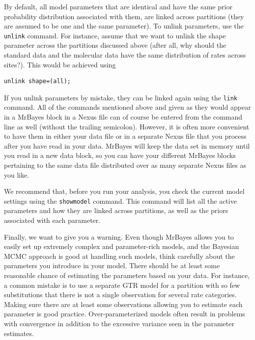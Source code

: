 \documentclass[12pt]{book}
\newcommand{\ttt}[1]{\texttt{#1} }
\begin{document}
By default, all model parameters that are identical and have the same prior probability
distribution associated with them, are linked across partitions (they are assumed to be one
and the same parameter). To unlink parameters, use the \ttt{unlink} command. For instance,
assume that we want to unlink the shape parameter across the partitions discussed above
(after all, why should the standard data and the molecular data have the same distribution
of rates across sites?). This would be achieved using

\begin{singlespacing}
\small
\begin{verbatim}
unlink shape=(all);
\end{verbatim}
\normalsize
\end{singlespacing}

If you unlink parameters by mistake, they can be linked again using the \ttt{link} command.
All of the commands mentioned above and given as they would appear in a MrBayes
block in a Nexus file can of course be entered from the command line as well (without
the trailing semicolon). However, it is often more convenient to have them in either your
data file or in a separate Nexus file that you process after you have read in your data.
MrBayes will keep the data set in memory until you read in a new data block, so you can
have your different MrBayes blocks pertaining to the same data file distributed over as
many separate Nexus files as you like.

We recommend that, before you run your analysis, you check the current model settings
using the \ttt{showmodel} command. This command will list all the active parameters and
how they are linked across partitions, as well as the priors associated with each
parameter.

Finally, we want to give you a warning. Even though MrBayes allows you to easily set up
extremely complex and parameter-rich models, and the Bayesian MCMC approach is
good at handling such models, think carefully about the parameters you introduce in your
model. There should be at least some reasonable chance of estimating the parameters
based on your data. For instance, a common mistake is to use a separate GTR model for a
partition with so few substitutions that there is not a single observation for several rate
categories. Making sure there are at least some observations allowing you to estimate
each parameter is good practice. Over-parameterized models often result in problems
with convergence in addition to the excessive variance seen in the parameter estimates.
\end{document}
